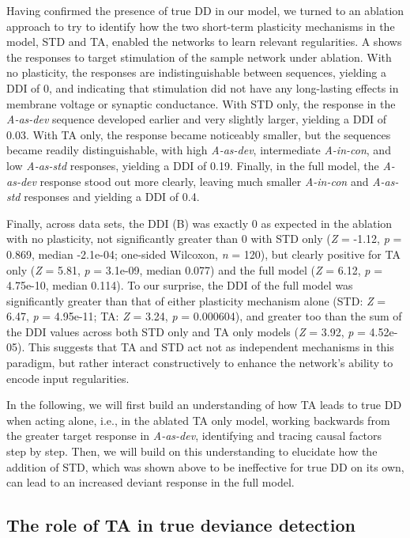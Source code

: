 \documentclass[9pt,lineno,onehalfspacing]{elife}
\newcommand{\dev}{\textit{A-as-dev}}
\newcommand{\msc}{\textit{A-in-con}}
\newcommand{\std}{\textit{A-as-std}}
\begin{document}
Having confirmed the presence of true DD in our model, we turned to an ablation approach to try to identify how the two short-term plasticity mechanisms in the model, STD and TA, enabled the networks to learn relevant regularities. A shows the responses to target stimulation of the sample network under ablation. With no plasticity, the responses are indistinguishable between sequences, yielding a DDI of 0, and indicating that stimulation did not have any long-lasting effects in membrane voltage or synaptic conductance. With STD only, the response in the \dev{} sequence developed earlier and very slightly larger, yielding a DDI of 0.03. With TA only, the response became noticeably smaller, but the sequences became readily distinguishable, with high \dev{}, intermediate \msc{}, and low \std{} responses, yielding a DDI of 0.19. Finally, in the full model, the \dev{} response stood out more clearly, leaving much smaller \msc{} and \std{} responses and yielding a DDI of 0.4.

Finally, across data sets, the DDI (B) was exactly 0 as expected in the ablation with no plasticity, not significantly greater than 0 with STD only (\textit{Z} = -1.12, \textit{p} = 0.869, median -2.1e-04; one-sided Wilcoxon, \textit{n} = 120), but clearly positive for TA only (\textit{Z} = 5.81, \textit{p} = 3.1e-09, median 0.077) and the full model (\textit{Z} = 6.12, \textit{p} = 4.75e-10, median 0.114). To our surprise, the DDI of the full model was significantly greater than that of either plasticity mechanism alone (STD: \textit{Z} = 6.47, \textit{p} = 4.95e-11; TA: \textit{Z} = 3.24, \textit{p} = 0.000604), and greater too than the sum of the DDI values across both STD only and TA only models (\textit{Z} = 3.92, \textit{p} = 4.52e-05). This suggests that TA and STD act not as independent mechanisms in this paradigm, but rather interact constructively to enhance the network's ability to encode input regularities.

In the following, we will first build an understanding of how TA leads to true DD when acting alone, i.e., in the ablated TA only model, working backwards from the greater target response in \dev{}, identifying and tracing causal factors step by step. Then, we will build on this understanding to elucidate how the addition of STD, which was shown above to be ineffective for true DD on its own, can lead to an increased deviant response in the full model.

\subsection{The role of TA in true deviance detection}\label{sec:ta}
\end{document}
